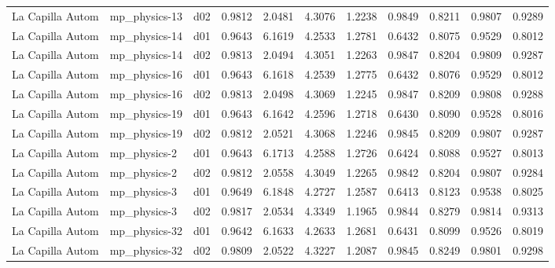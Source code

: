 \begin{longtable}{lllrrrrrrrr}
     La Capilla Autom  &         mp\_physics-13 &     d02 &   0.9812 &   2.0481 &   4.3076 &       1.2238 &        0.9849 &       0.8211 &           0.9807 &  0.9289 \\
     La Capilla Autom  &         mp\_physics-14 &     d01 &   0.9643 &   6.1619 &   4.2533 &       1.2781 &        0.6432 &       0.8075 &           0.9529 &  0.8012 \\
     La Capilla Autom  &         mp\_physics-14 &     d02 &   0.9813 &   2.0494 &   4.3051 &       1.2263 &        0.9847 &       0.8204 &           0.9809 &  0.9287 \\
     La Capilla Autom  &         mp\_physics-16 &     d01 &   0.9643 &   6.1618 &   4.2539 &       1.2775 &        0.6432 &       0.8076 &           0.9529 &  0.8012 \\
     La Capilla Autom  &         mp\_physics-16 &     d02 &   0.9813 &   2.0498 &   4.3069 &       1.2245 &        0.9847 &       0.8209 &           0.9808 &  0.9288 \\
     La Capilla Autom  &         mp\_physics-19 &     d01 &   0.9643 &   6.1642 &   4.2596 &       1.2718 &        0.6430 &       0.8090 &           0.9528 &  0.8016 \\
     La Capilla Autom  &         mp\_physics-19 &     d02 &   0.9812 &   2.0521 &   4.3068 &       1.2246 &        0.9845 &       0.8209 &           0.9807 &  0.9287 \\
     La Capilla Autom  &          mp\_physics-2 &     d01 &   0.9643 &   6.1713 &   4.2588 &       1.2726 &        0.6424 &       0.8088 &           0.9527 &  0.8013 \\
     La Capilla Autom  &          mp\_physics-2 &     d02 &   0.9812 &   2.0558 &   4.3049 &       1.2265 &        0.9842 &       0.8204 &           0.9807 &  0.9284 \\
     La Capilla Autom  &          mp\_physics-3 &     d01 &   0.9649 &   6.1848 &   4.2727 &       1.2587 &        0.6413 &       0.8123 &           0.9538 &  0.8025 \\
     La Capilla Autom  &          mp\_physics-3 &     d02 &   0.9817 &   2.0534 &   4.3349 &       1.1965 &        0.9844 &       0.8279 &           0.9814 &  0.9313 \\
     La Capilla Autom  &         mp\_physics-32 &     d01 &   0.9642 &   6.1633 &   4.2633 &       1.2681 &        0.6431 &       0.8099 &           0.9526 &  0.8019 \\
     La Capilla Autom  &         mp\_physics-32 &     d02 &   0.9809 &   2.0522 &   4.3227 &       1.2087 &        0.9845 &       0.8249 &           0.9801 &  0.9298 \\

\end{longtable}
